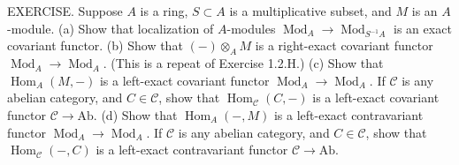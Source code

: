 EXERCISE. Suppose $A$ is a ring, $S\subset A$ is a multiplicative subset, and $M$ is an $A$-module. (a) Show that localization of $A$-modules $\operatorname{Mod}_A\to\operatorname{Mod}_{S^{-1}A}$ is an exact covariant functor. (b) Show that $(-)\otimes_A M$ is a right-exact covariant functor $\operatorname{Mod}_A\to\operatorname{Mod}_A$. (This is a repeat of Exercise 1.2.H.) (c) Show that $\operatorname{Hom}_A(M,-)$ is a left-exact covariant functor $\operatorname{Mod}_A\to\operatorname{Mod}_A$. If $\mathcal{C}$ is any abelian category, and $C\in\mathcal{C}$, show that $\operatorname{Hom}_{\mathcal{C}}(C,-)$ is a left-exact covariant functor $\mathcal{C}\to\mathrm{Ab}$. (d) Show that $\operatorname{Hom}_A(-,M)$ is a left-exact contravariant functor $\operatorname{Mod}_A\to\operatorname{Mod}_A$. If $\mathcal{C}$ is any abelian category, and $C\in\mathcal{C}$, show that $\operatorname{Hom}_{\mathcal{C}}(-,C)$ is a left-exact contravariant functor $\mathcal{C}\to\mathrm{Ab}$.
